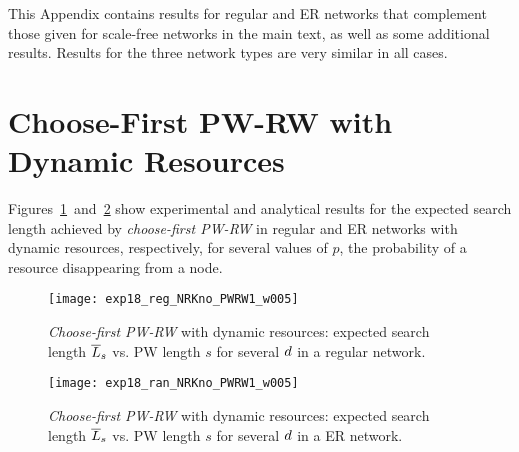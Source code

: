 \documentclass[]{elsarticle}
\newcommand{\s}		{\ensuremath{s}}		\newcommand{\sopt}	{\ensuremath{s_{opt}}}		\newcommand{\p}		{\ensuremath{p}}		\newcommand{\W}		{\ensuremath{W}}		\newcommand{\w}		{\ensuremath{w}}		\newcommand{\lsave}	{\ensuremath{\overline{l}_s}}	\newcommand{\lave}	{\ensuremath{\overline{l}}}	\newcommand{\lopt}	{\ensuremath{\overline{l}_{opt}}}
\begin{document}
\appendix

This Appendix contains results for regular and ER networks that complement those given for scale-free networks in the main text, as well as some additional results. Results for the three network types are very similar in all cases.

\section{Choose-First PW-RW with Dynamic Resources}

Figures~\ref{fig:regular_pw1}~and~\ref{fig:random_pw1} show experimental and analytical results for the expected search length achieved by \emph{choose-first PW-RW} in regular and ER networks with dynamic resources, respectively, for several values of $p$, the probability of a resource disappearing from a node.

\begin{figure}[h]
 \centering
\texttt{[image: exp18\_reg\_NRKno\_PWRW1\_w005]}
 \caption{\emph{Choose-first PW-RW} with dynamic resources: expected search length $\overline{L}_s$ vs. PW length $\s$ for several $d$ in a regular network.}
 \label{fig:regular_pw1}
\end{figure}

\begin{figure}[h]
 \centering
 \texttt{[image: exp18\_ran\_NRKno\_PWRW1\_w005]}
 \caption{\emph{Choose-first PW-RW} with dynamic resources: expected search length $\overline{L}_s$ vs. PW length $\s$ for several $d$ in a ER network.}
 \label{fig:random_pw1}
\end{figure}
\end{document}
